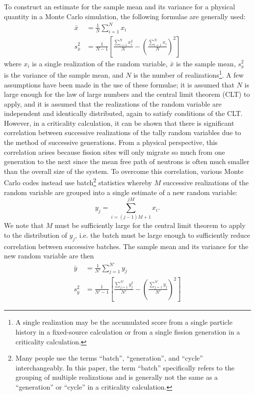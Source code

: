 To construct an estimate for the sample mean and its variance for a physical
quantity in a Monte Carlo simulation, the following formulae are generally used:
\begin{align}
  \bar{x} &= \frac{1}{N} \sum_{i=1}^N x_i \\ s^2_{\bar{x}} &= \frac{1}{N-1}
  \left [ \frac{\sum_{i=1}^N x_i^2}{N} - \left ( \frac{\sum_{i=1}^N x_i}{N}
    \right )^2 \right ]
\end{align}
where $x_i$ is a single realization of the random variable, $\bar{x}$ is the
sample mean, $s^2_{\bar{x}}$ is the variance of the sample mean, and $N$ is the
number of realizations\footnote{A single realization may be the accumulated
  score from a single particle history in a fixed-source calculation or from a
  single fission generation in a criticality calculation.}. A few assumptions
have been made in the use of these formulae; it is assumed that $N$ is large
enough for the law of large numbers and the central limit theorem (CLT) to
apply, and it is assumed that the realizations of the random variable are
independent and identically distributed, again to satisfy conditions of the
CLT. However, in a criticality calculation, it can be shown that there is
significant correlation between successive realizations of the tally random
variables due to the method of successive generations. From a physical
perspective, this correlation arises because fission sites will only migrate so
much from one generation to the next since the mean free path of neutrons is
often much smaller than the overall size of the system. To overcome this
correlation, various Monte Carlo codes instead use batch\footnote{Many people
  use the terms ``batch'', ``generation'', and ``cycle'' interchangeably. In
  this paper, the term ``batch'' specifically refers to the grouping of multiple
  realizations and is generally not the same as a ``generation'' or ``cycle'' in
  a criticality calculation.} statistics whereby $M$ successive realizations of
the random variable are grouped into a single estimate of a new random variable:
\begin{equation}
  y_j = \sum_{i=(j-1)M + 1}^{jM} x_i.
\end{equation}
We note that $M$ must be sufficiently large for the central limit theorem to
apply to the distribution of $y_j$, i.e. the batch must be large enough to
sufficiently reduce correlation between successive batches. The sample mean and
its variance for the new random variable are then
\begin{align}
  \bar{y} &= \frac{1}{N'} \sum_{j=1}^{N'} y_j \\ s^2_{\bar{y}} &= \frac{1}{N'-1}
  \left [ \frac{\sum_{j=1}^{N'} y_j^2}{N'} - \left ( \frac{\sum_{j=1}^{N'} y_j}{N'}
    \right )^2 \right ]
\end{align}
